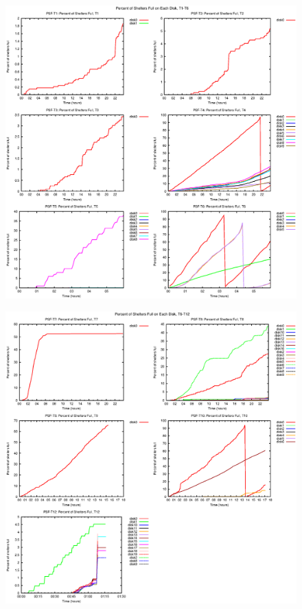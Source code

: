 \documentclass[10pt]{article}
\begin{document}
\begin{figure}
\includegraphics[scale=2, width=\textwidth]{full_shelt_percent1.eps}
\end{figure}

\begin{figure}
\includegraphics[scale=2, width=\textwidth]{full_shelt_percent2.eps}
\end{figure}
\end{document}

